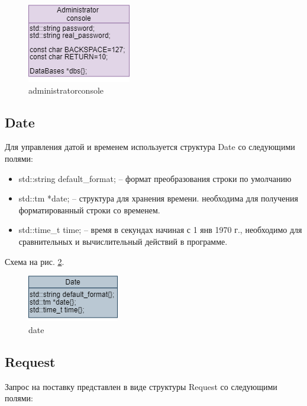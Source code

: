 \begin{figure}[hpt!]
    \centering
    \includegraphics[width=0.4\linewidth]{photo/data_structures/administrator_console}
    \caption{administratorconsole}
    \label{administrator_console}
\end{figure}

\subsection{Date}

Для управления датой и временем используется структура Date со следующими полями: 

\begin{itemize}
    \item std::string default\_format{}; -- формат преобразования строки по умолчанию
    \item std::tm *date{}; -- структура для хранения времени. необходима для получения форматированный строки со временем.
    \item std::time\_t time{}; -- время в секундах начиная с 1 янв 1970 г., необходимо для сравнительных и вычислительный действий в программе.
\end{itemize}

Схема на рис. \ref{date}.

\begin{figure}[hpt!]
    \centering
    \includegraphics[width=0.4\linewidth]{photo/data_structures/date}
    \caption{date}
    \label{date}
\end{figure}

\subsection{Request}

Запрос на поставку представлен в виде структуры Request со следующими полями: 

